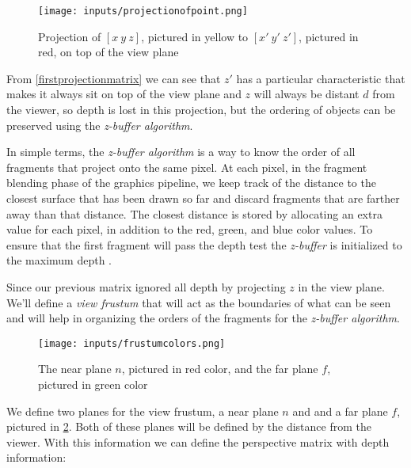 \documentclass[cic,tc,english]{iiufrgs}
\begin{document}
\begin{figure}[hbt!]
    \caption{Projection of $[x\ y\ z]$, pictured in yellow to $[x'\ y'\ z']$, pictured in red, on top of the view plane}
    \begin{center}
        \texttt{[image: inputs/projectionofpoint.png]}
    \end{center}
    \label{projectionofpoint}
\end{figure}

From \cref{firstprojectionmatrix} we can see that $z'$ has a particular characteristic that makes it always sit on top of the view plane and $z$ will always be distant $d$ from the viewer, so depth is lost in this projection, but the ordering of objects can be preserved using the \textit{z-buffer algorithm}.

In simple terms, the \textit{z-buffer algorithm} is a way to know the order of all fragments that project onto the same pixel. At each pixel, in the fragment blending phase of the graphics pipeline, we keep track of the distance to the closest surface that has been drawn so far and discard fragments that are farther away than that distance. The closest distance is stored by allocating an extra value for each pixel, in addition to the red, green, and blue color values. To ensure that the first fragment will pass the depth test the \textit{z-buffer} is initialized to the maximum depth \cite{Marschner2021CGFundamentals}. 

Since our previous matrix ignored all depth by projecting $z$ in the view plane. We'll define a \textit{view frustum} that will act as the boundaries of what can be seen and will help in organizing the orders of the fragments for the \textit{z-buffer algorithm}.

\begin{figure}[hbt!]
    \caption{The near plane $n$, pictured in red color, and the far plane $f$, pictured in green color}
    \begin{center}
        \texttt{[image: inputs/frustumcolors.png]}
    \end{center}
    \label{frustumcolors}
\end{figure}

We define two planes for the view frustum, a near plane $n$ and and a far plane $f$, pictured in \cref{frustumcolors}. Both of these planes will be defined by the distance from the viewer. With this information we can define the perspective matrix with depth information: 
\end{document}
